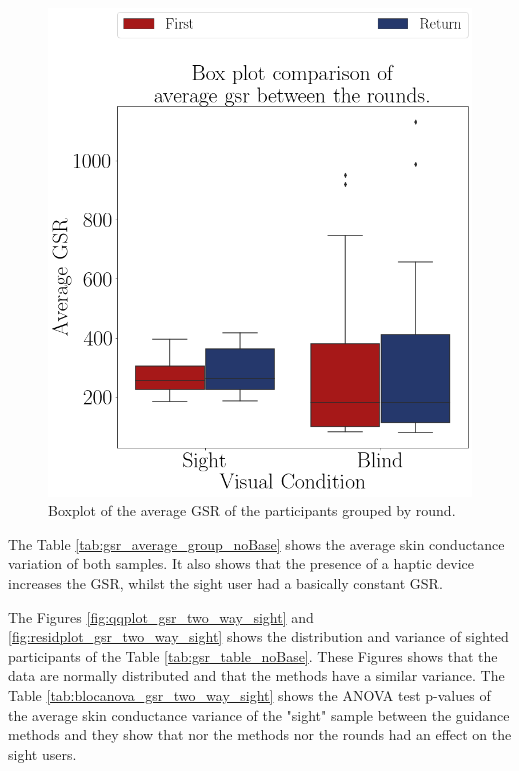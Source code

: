 \begin{figure}[!htb]
\begin{minipage}{0.45\textwidth}
        \includegraphics[width = 0.8\linewidth]{Resultados/GSR/Figuras/png/boxplot_gsr_avg_4_rounds.png}
        \caption{Boxplot of the average GSR of the participants grouped by round.}
        \label{fig:boxplot_gsr_avg_4_rounds}
    \end{minipage}
\end{figure}
 
The Table \ref{tab:gsr_average_group_noBase} shows the average skin conductance variation of both samples. It also shows that the presence of a haptic device increases the GSR, whilst the sight user had a basically constant GSR.



The Figures \ref{fig:qqplot_gsr_two_way_sight} and \ref{fig:residplot_gsr_two_way_sight} shows the distribution and variance of sighted participants of the Table \ref{tab:gsr_table_noBase}. These Figures shows that the data are normally distributed and that the methods have a similar variance.
The Table \ref{tab:blocanova_gsr_two_way_sight} shows the ANOVA test p-values of the average skin conductance variance of the "sight" sample between the guidance methods and they show that nor the methods nor the rounds had an effect on the sight users.



